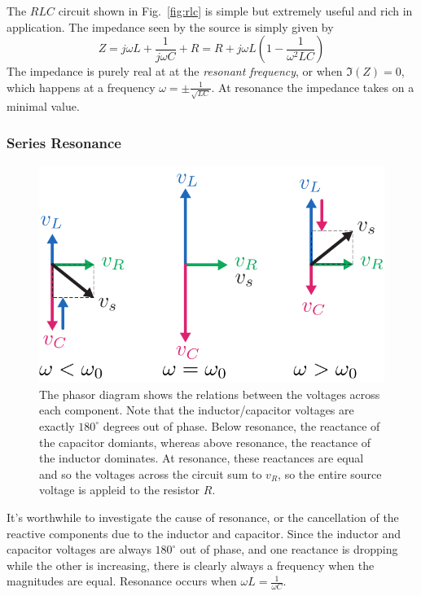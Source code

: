 The $RLC$ circuit shown in Fig.~\ref{fig:rlc} is simple but extremely useful and rich in application.  The impedance seen by the source is simply given by
\begin{equation}
  Z = j\omega L + \frac{1}{j\omega C} + R 
    = R + j\omega L \left( 1 - \frac{1}{\omega^2 LC}\right) 
\end{equation}
The impedance is purely real at at the \emph{resonant frequency}, or
when $\Im(Z) = 0$, which happens at a frequency $\omega = \pm \frac{1}{\sqrt{L C}}$.  At resonance the impedance takes on a minimal value.  


\subsubsection{Series Resonance}

\begin{figure}
\begin{center}
\includegraphics[scale=.8]{rlcphasor}
\end{center}
\caption{The phasor diagram shows the relations between the voltages across each component.  Note that the inductor/capacitor voltages are exactly $180^\circ$ degrees out of phase.  Below resonance, the reactance of the capacitor domiants, whereas above resonance, the reactance of the inductor dominates.  At resonance, these reactances are equal and so the voltages across the circuit sum to $v_R$, so the entire source voltage is appleid to the resistor $R$. } \label{fig:rlcphasor}
\end{figure}

It's worthwhile to investigate the cause of resonance, or the cancellation of the reactive
components due to the inductor and capacitor.  Since the inductor and
capacitor voltages are always $180^\circ$ out of phase, and one reactance is dropping while the other is increasing, there is clearly always a frequency when the magnitudes
are equal.    Resonance occurs when $\omega L = \frac{1}{\omega C}$.  


